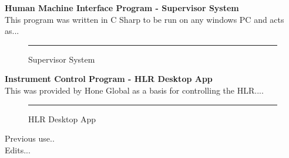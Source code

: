 \documentclass{UoNMCHA}
\numberwithin{equation}{section}
\begin{document}
\textbf{Human Machine Interface Program - Supervisor System}\\
This program was written in C Sharp to be run on any windows PC and acts as... \\
\begin{figure}[h]
	\centering
	\rule{0.5\textwidth}{0.5\textwidth}%
	\caption{Supervisor System}
	\label{fig:Supervisor System}
\end{figure}

\textbf{Instrument Control Program - HLR Desktop App}\\
This was provided by Hone Global as a basis for controlling the HLR.... \\
\begin{figure}[h]
	\centering
	\rule{0.5\textwidth}{0.5\textwidth}%
	\caption{HLR Desktop App}
	\label{fig:HLR Desktop App}
\end{figure}

Previous use.. \\

Edits... \\
\end{document}
